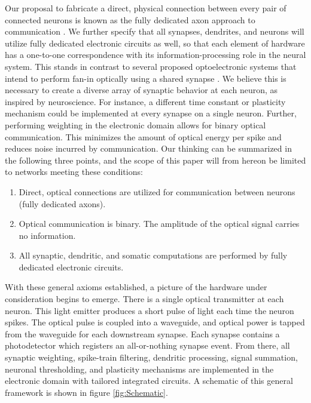 \documentclass[twocolumn]{article}
\begin{document}
Our proposal to fabricate a direct, physical connection between every pair of connected neurons is known as the fully dedicated axon approach to communication \cite{seda2016}. We further specify that all synapses, dendrites, and neurons will utilize fully dedicated electronic circuits as well, so that each element of hardware has a one-to-one correspondence with its information-processing role in the neural system. This stands in contrast to several proposed optoelectronic systems that intend to perform fan-in optically using a shared synapse \cite{nazirzadeh2018energy}. We believe this is necessary to create a diverse array of synaptic behavior at each neuron, as inspired by neuroscience. For instance, a different time constant or plasticity mechanism could be implemented at every synapse on a single neuron. Further, performing weighting in the electronic domain allows for binary optical communication. This minimizes the amount of optical energy per spike and reduces noise incurred by communication. Our thinking can be summarized in the following three points, and the scope of this paper will from hereon be limited to networks meeting these conditions:

\begin{enumerate}
    \item Direct, optical connections are utilized for communication between neurons (fully dedicated axons).
    \item Optical communication is binary. The amplitude of the optical signal carries no information.
    \item All synaptic, dendritic, and somatic computations are performed by fully dedicated electronic circuits.
\end{enumerate}

With these general axioms established, a picture of the hardware under consideration begins to emerge. There is a single optical transmitter at each neuron. This light emitter produces a short pulse of light each time the neuron spikes. The optical pulse is coupled into a waveguide, and optical power is tapped from the waveguide for each downstream synapse. Each synapse contains a photodetector which registers an all-or-nothing synapse event. From there, all synaptic weighting, spike-train filtering, dendritic processing, signal summation, neuronal thresholding, and plasticity mechanisms are implemented in the electronic domain with tailored integrated circuits. A schematic of this general framework is shown in figure \ref{fig:Schematic}.
\end{document}
